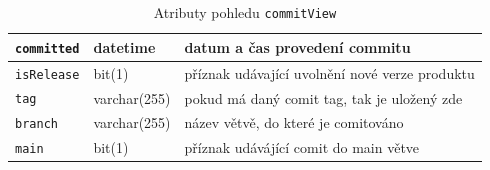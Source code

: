 \documentclass[czech,DP]{thesiskiv}
\begin{document}
\begin{itemize}
\begin{table}[]
\begin{tabular}{|l|l|l|}
        \texttt{committed}    	& datetime     & datum a čas provedení commitu                                    \\ \hline
        \texttt{isRelease}      & bit(1)          & příznak udávající uvolnění nové verze produktu \\ \hline
        \texttt{tag}          	& varchar(255) & pokud má daný comit tag, tak je uložený zde                      \\ \hline
        \texttt{branch}         & varchar(255)    & název větvě, do které je comitováno                           \\ \hline
        \texttt{main}         	& bit(1)       & příznak udávájící comit do main větve        \\  \hline
        \end{tabular}
        \caption{\label{tab:commitview}Atributy pohledu \texttt{commitView}}
    \end{table}
    

\end{itemize}
\end{document}

